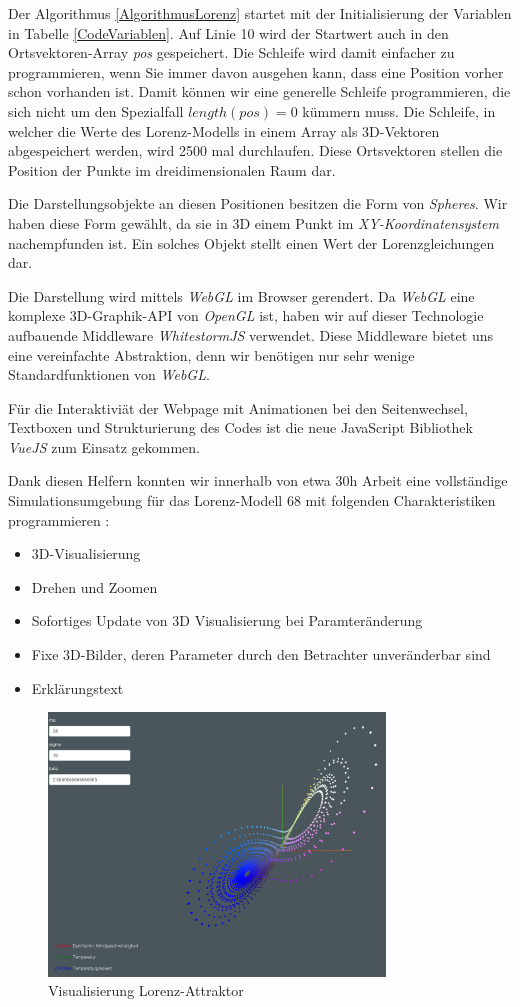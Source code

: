 Der Algorithmus \ref{AlgorithmusLorenz} startet mit der Initialisierung der Variablen in Tabelle \ref{CodeVariablen}. Auf Linie 10 wird der Startwert auch in den Ortsvektoren-Array \textit{pos} gespeichert. Die Schleife wird damit einfacher zu programmieren, wenn Sie immer davon ausgehen kann, dass eine Position vorher schon vorhanden ist. Damit können wir eine generelle Schleife programmieren, die sich nicht um den Spezialfall $ length(pos) = 0 $ kümmern muss.
Die Schleife, in welcher die Werte des Lorenz-Modells in einem Array als 3D-Vektoren abgespeichert werden, wird 2500 mal durchlaufen. Diese Ortsvektoren stellen die Position der Punkte im dreidimensionalen Raum dar.

Die Darstellungsobjekte an diesen Positionen besitzen die Form von \textit{Spheres}. Wir haben diese Form gewählt, da sie in 3D einem Punkt im \textit{XY-Koordinatensystem} nachempfunden ist. Ein solches Objekt stellt einen Wert der Lorenzgleichungen dar.

Die Darstellung wird mittels \textit{WebGL} \cite{WebGL} im Browser gerendert. Da \textit{WebGL} eine komplexe 3D-Graphik-API von \textit{OpenGL} ist, haben wir auf dieser Technologie aufbauende Middleware \textit{WhitestormJS} \cite{whitestormJS} verwendet. Diese Middleware bietet uns eine vereinfachte Abstraktion, denn wir benötigen nur sehr wenige Standardfunktionen von \textit{WebGL}.

Für die Interaktiviät der Webpage mit Animationen bei den Seitenwechsel, Textboxen und Strukturierung des Codes ist die neue JavaScript Bibliothek \textit{VueJS} \cite{VueJS} zum Einsatz gekommen.

Dank diesen Helfern konnten wir innerhalb von etwa 30h Arbeit eine vollständige Simulationsumgebung für das Lorenz-Modell 68 mit folgenden Charakteristiken programmieren \cite{visualisierung}:

\begin{itemize}
	\item 3D-Visualisierung
	\item Drehen und Zoomen
	\item Sofortiges Update von 3D Visualisierung bei Paramteränderung
	\item Fixe 3D-Bilder, deren Parameter durch den Betrachter unveränderbar sind
	\item Erklärungstext
\end{itemize}

\begin{figure}
	\centering	\includegraphics[height=7cm]{lorenz/assets/implementation/Visualisierung}
	\caption{Visualisierung Lorenz-Attraktor}
	\label{fig:visualisierung}
\end{figure}
